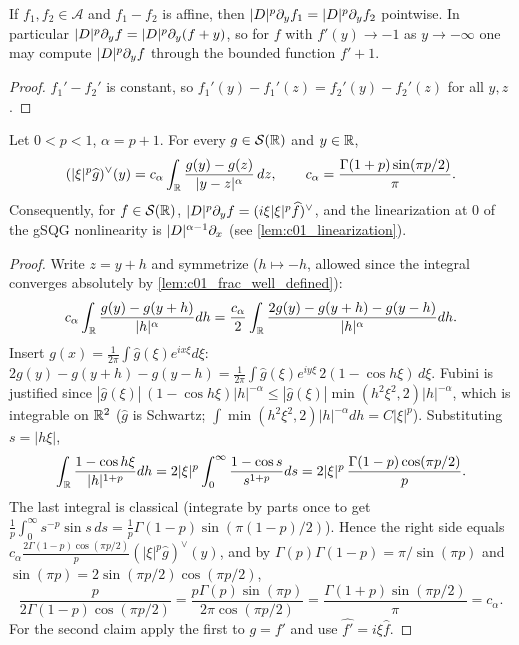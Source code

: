\begin{lemma}
  \label{lem:c01_frac_affine}
  If $f_1,f_2\in\mathcal A$ and $f_1-f_2$ is affine, then $|D|^p\partial_yf_1=|D|^p\partial_yf_2$
  pointwise.  In particular $|D|^p\partial_y f=|D|^p\partial_y(f+y)$, so for $f$ with
  $f'(y)\to-1$ as $y\to-\infty$ one may compute $|D|^p\partial_yf$ through the bounded function
  $f'+1$.
\end{lemma}
\begin{proof}
  $f_1'-f_2'$ is constant, so $f_1'(y)-f_1'(z)=f_2'(y)-f_2'(z)$ for all $y,z$.
\end{proof}

\begin{lemma}
  \label{lem:c01_frac_singular_integral}
  Let $0<p<1$, $\alpha=p+1$.  For every $g\in\mathcal S(\mathbb{R})$ and $y\in\mathbb{R}$,
  \[
    (|\xi|^p\widehat g)^\vee(y)=c_\alpha\int_{\mathbb{R}}\frac{g(y)-g(z)}{|y-z|^{\alpha}}\,dz,
    \qquad c_\alpha=\frac{\Gamma(1+p)\sin(\pi p/2)}{\pi}.
  \]
  Consequently, for $f\in\mathcal S(\mathbb{R})$, $|D|^p\partial_y f=(i\xi|\xi|^p\widehat f)^\vee$, and the
  linearization at $0$ of the gSQG nonlinearity is $|D|^{\alpha-1}\partial_x$ (see
  \cref{lem:c01_linearization}).
\end{lemma}
\begin{proof}
  Write $z=y+h$ and symmetrize ($h\mapsto-h$, allowed since the integral converges absolutely
  by \cref{lem:c01_frac_well_defined}):
  \[
    c_\alpha\int_{\mathbb{R}}\frac{g(y)-g(y+h)}{|h|^{\alpha}}dh
    =\frac{c_\alpha}2\int_{\mathbb{R}}\frac{2g(y)-g(y+h)-g(y-h)}{|h|^{\alpha}}dh .
  \]
  Insert $g(x)=\frac1{2\pi}\int\widehat g(\xi)e^{ix\xi}d\xi$:
  $2g(y)-g(y+h)-g(y-h)=\frac1{2\pi}\int\widehat g(\xi)e^{iy\xi}\,2(1-\cos h\xi)\,d\xi$.
  Fubini is justified since $|\widehat g(\xi)|\,(1-\cos h\xi)|h|^{-\alpha}
  \le|\widehat g(\xi)|\min(h^2\xi^2,2)|h|^{-\alpha}$, which is integrable on $\mathbb{R}^2$
  ($\widehat g$ is Schwartz; $\int\min(h^2\xi^2,2)|h|^{-\alpha}dh=C|\xi|^{p}$).
  Substituting $s=|h\xi|$,
  \[
    \int_{\mathbb{R}}\frac{1-\cos h\xi}{|h|^{1+p}}dh=2|\xi|^p\int_0^\infty\frac{1-\cos s}{s^{1+p}}ds
    =2|\xi|^p\,\frac{\Gamma(1-p)\cos(\pi p/2)}{p}.
  \]
  The last integral is classical (integrate by parts once to get
  $\frac1p\int_0^\infty s^{-p}\sin s\,ds=\frac1p\Gamma(1-p)\sin(\pi(1-p)/2)$).
  Hence the right side equals $c_\alpha\frac{2\Gamma(1-p)\cos(\pi p/2)}{p}(|\xi|^p\widehat g)^\vee(y)$,
  and by $\Gamma(p)\Gamma(1-p)=\pi/\sin(\pi p)$ and $\sin(\pi p)=2\sin(\pi p/2)\cos(\pi p/2)$,
  \[
    \frac{p}{2\Gamma(1-p)\cos(\pi p/2)}=\frac{p\Gamma(p)\sin(\pi p)}{2\pi\cos(\pi p/2)}
    =\frac{\Gamma(1+p)\sin(\pi p/2)}{\pi}=c_\alpha .
  \]
  For the second claim apply the first to $g=f'$ and use $\widehat{f'}=i\xi\widehat f$.
\end{proof}

